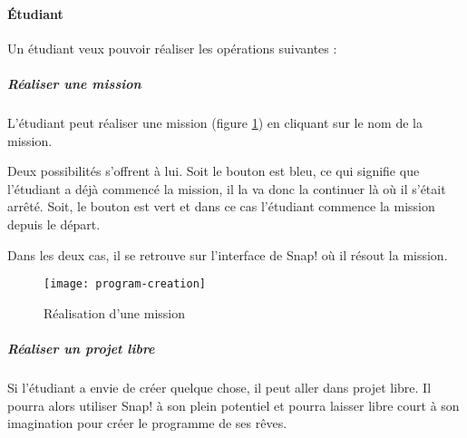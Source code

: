 \paragraph{Étudiant}
Un étudiant veux pouvoir réaliser les opérations suivantes :
\subparagraph{Réaliser une mission} L'étudiant peut réaliser une mission (figure \ref{fig:program-creation}) en cliquant sur le nom de la mission. 

Deux possibilités s'offrent à lui. Soit le bouton est bleu, ce qui signifie que l'étudiant a déjà commencé la mission, il la va donc la continuer là où il s'était arrêté. Soit, le bouton est vert et dans ce cas l'étudiant commence la mission depuis le départ.

Dans les deux cas, il se retrouve sur l'interface de Snap! où il résout la mission.
\begin{figure}
  \begin{center}
    \texttt{[image: program-creation]}
    \caption{Réalisation d'une mission}
    \label{fig:program-creation}
  \end{center}
\end{figure}

\subparagraph{Réaliser un projet libre} Si l'étudiant a envie de créer quelque chose, il peut aller dans projet libre. Il pourra alors utiliser Snap! à son plein potentiel et pourra laisser libre court à son imagination pour créer le programme de ses rêves.
